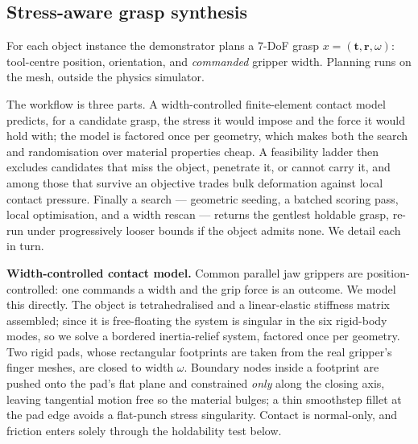 %
%

\subsection{Stress-aware grasp synthesis}
\label{sec:method:synth}
For each object instance the demonstrator plans a $7$-DoF grasp
$x=(\mathbf{t},\mathbf{r},\omega)$: tool-centre position, orientation, and \emph{commanded}
gripper width. Planning runs on the mesh, outside the physics simulator.

The workflow is three parts. A width-controlled finite-element contact model predicts, for a
candidate grasp, the stress it would impose and the force it would hold with; the model is
factored once per geometry, which makes both the search and randomisation over material
properties cheap. A feasibility ladder then excludes candidates that miss the object, penetrate it,
or cannot carry it, and among those that survive an objective trades bulk deformation against
local contact pressure. Finally a search --- geometric seeding, a batched
scoring pass, local optimisation, and a width rescan --- returns the gentlest holdable grasp,
re-run under progressively looser bounds if the object admits none. We detail each in turn.

\noindent\textbf{Width-controlled contact model.}
Common parallel jaw grippers are position-controlled: one commands a width and the grip force is an
outcome. We model this directly. The object is tetrahedralised and a linear-elastic stiffness
matrix assembled; since it is free-floating the system is singular in the six rigid-body modes,
so we solve a bordered inertia-relief system, factored once per geometry. Two rigid pads, whose
rectangular footprints are taken from the real gripper's finger meshes, are closed to width
$\omega$. Boundary nodes inside a footprint are pushed onto the pad's flat plane and constrained
\emph{only} along the closing axis, leaving tangential motion free so the material bulges; a
thin smoothstep fillet at the pad edge avoids a flat-punch stress singularity. Contact is
normal-only, and friction enters solely through the holdability test below.

